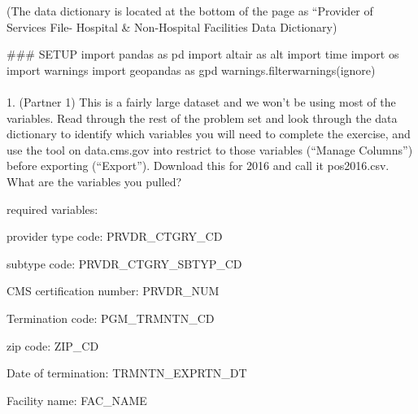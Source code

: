 \documentclass[
  letterpaper,
  DIV=11,
  numbers=noendperiod]{scrartcl}
\makeatletter
\let\oldparagraph\paragraph
\renewcommand{\paragraph}{
    \@ifstar
      \xxxParagraphStar
      \xxxParagraphNoStar
  }
\newcommand{\xxxParagraphStar}[1]{\oldparagraph*{#1}\mbox{}}
\newcommand{\xxxParagraphNoStar}[1]{\oldparagraph{#1}\mbox{}}
\newenvironment{Shaded}{\begin{snugshade}}{\end{snugshade}}
\newcommand{\CommentTok}[1]{\textcolor[rgb]{0.37,0.37,0.37}{#1}}
\newcommand{\ImportTok}[1]{\textcolor[rgb]{0.00,0.46,0.62}{#1}}
\newcommand{\NormalTok}[1]{\textcolor[rgb]{0.00,0.23,0.31}{#1}}
\newcommand{\StringTok}[1]{\textcolor[rgb]{0.13,0.47,0.30}{#1}}
\makeatother
\begin{document}
(The data dictionary is located at the bottom of the page as ``Provider
of Services File- Hospital \& Non-Hospital Facilities Data Dictionary)

\begin{Shaded}
\begin{Highlighting}[]
\CommentTok{\#\#\# SETUP }
\ImportTok{import}\NormalTok{ pandas }\ImportTok{as}\NormalTok{ pd}
\ImportTok{import}\NormalTok{ altair }\ImportTok{as}\NormalTok{ alt}
\ImportTok{import}\NormalTok{ time}
\ImportTok{import}\NormalTok{ os}
\ImportTok{import}\NormalTok{ warnings}
\ImportTok{import}\NormalTok{ geopandas }\ImportTok{as}\NormalTok{ gpd}
\NormalTok{warnings.filterwarnings(}\StringTok{\textquotesingle{}ignore\textquotesingle{}}\NormalTok{)}
\end{Highlighting}
\end{Shaded}

\paragraph{1. (Partner 1) This is a fairly large dataset and we won't be
using most of the variables. Read through the rest of the problem set
and look through the data dictionary to identify which variables you
will need to complete the exercise, and use the tool on data.cms.gov
into restrict to those variables (``Manage Columns'') before exporting
(``Export''). Download this for 2016 and call it pos2016.csv. What are
the variables you
pulled?}\label{partner-1-this-is-a-fairly-large-dataset-and-we-wont-be-using-most-of-the-variables.-read-through-the-rest-of-the-problem-set-and-look-through-the-data-dictionary-to-identify-which-variables-you-will-need-to-complete-the-exercise-and-use-the-tool-on-data.cms.gov-into-restrict-to-those-variables-manage-columns-before-exporting-export.-download-this-for-2016-and-call-it-pos2016.csv.-what-are-the-variables-you-pulled}

required variables:

provider type code: PRVDR\_CTGRY\_CD

subtype code: PRVDR\_CTGRY\_SBTYP\_CD

CMS certification number: PRVDR\_NUM

Termination code: PGM\_TRMNTN\_CD

zip code: ZIP\_CD

Date of termination: TRMNTN\_EXPRTN\_DT

Facility name: FAC\_NAME
\end{document}
